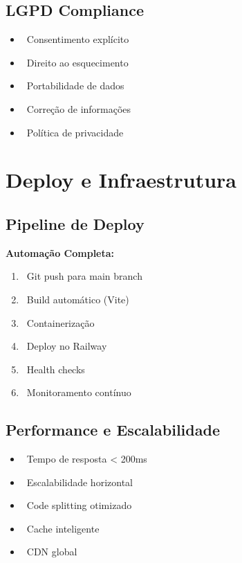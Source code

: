\documentclass[11pt,a4paper]{article}
\newcommand{\sectiontitle}[1]{\section{\color{oraldentsblue}#1}}
\begin{document}
\subsection{LGPD Compliance}
\begin{itemize}
    \item \faUserShield\ Consentimento explícito
    \item \faTrash\ Direito ao esquecimento
    \item \faDownload\ Portabilidade de dados
    \item \faEdit\ Correção de informações
    \item \faFileContract\ Política de privacidade
\end{itemize}

\sectiontitle{Deploy e Infraestrutura}

\subsection{Pipeline de Deploy}
\begin{tcolorbox}[colback=blue!5!white,colframe=oraldentsblue]
\textbf{Automação Completa:}
\begin{enumerate}
    \item \faCodeBranch\ Git push para main branch
    \item \faRocket\ Build automático (Vite)
    \item \faDocker\ Containerização
    \item \faCloud\ Deploy no Railway
    \item \faCheckCircle\ Health checks
    \item \faChartLine\ Monitoramento contínuo
\end{enumerate}
\end{tcolorbox}

\subsection{Performance e Escalabilidade}
\begin{itemize}
    \item \faTachometerAlt\ Tempo de resposta < 200ms
    \item \faExpand\ Escalabilidade horizontal
    \item \faCompress\ Code splitting otimizado
    \item \faDatabase\ Cache inteligente
    \item \faGlobe\ CDN global
\end{itemize}
\end{document}
